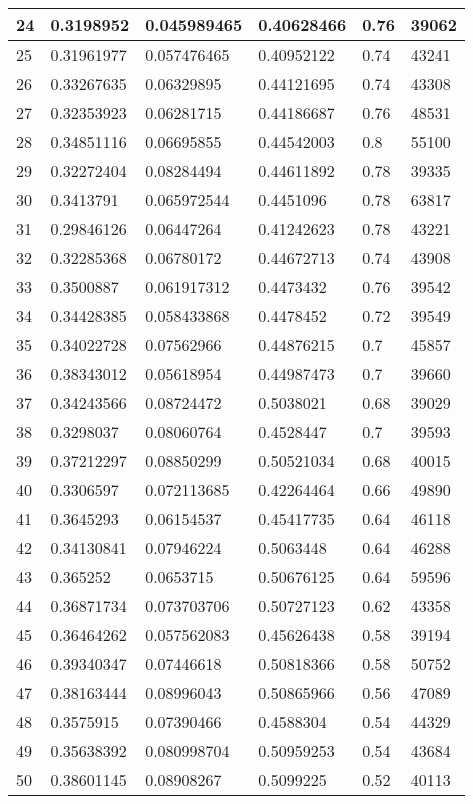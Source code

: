 \begin{longtable}{|l|l|l|l|l|l|}
24 & 0.3198952 & 0.045989465 & 0.40628466 & 0.76 & 39062 \\ \hline 
25 & 0.31961977 & 0.057476465 & 0.40952122 & 0.74 & 43241 \\ \hline 
26 & 0.33267635 & 0.06329895 & 0.44121695 & 0.74 & 43308 \\ \hline 
27 & 0.32353923 & 0.06281715 & 0.44186687 & 0.76 & 48531 \\ \hline 
28 & 0.34851116 & 0.06695855 & 0.44542003 & 0.8 & 55100 \\ \hline 
29 & 0.32272404 & 0.08284494 & 0.44611892 & 0.78 & 39335 \\ \hline 
30 & 0.3413791 & 0.065972544 & 0.4451096 & 0.78 & 63817 \\ \hline 
31 & 0.29846126 & 0.06447264 & 0.41242623 & 0.78 & 43221 \\ \hline 
32 & 0.32285368 & 0.06780172 & 0.44672713 & 0.74 & 43908 \\ \hline 
33 & 0.3500887 & 0.061917312 & 0.4473432 & 0.76 & 39542 \\ \hline 
34 & 0.34428385 & 0.058433868 & 0.4478452 & 0.72 & 39549 \\ \hline 
35 & 0.34022728 & 0.07562966 & 0.44876215 & 0.7 & 45857 \\ \hline 
36 & 0.38343012 & 0.05618954 & 0.44987473 & 0.7 & 39660 \\ \hline 
37 & 0.34243566 & 0.08724472 & 0.5038021 & 0.68 & 39029 \\ \hline 
38 & 0.3298037 & 0.08060764 & 0.4528447 & 0.7 & 39593 \\ \hline 
39 & 0.37212297 & 0.08850299 & 0.50521034 & 0.68 & 40015 \\ \hline 
40 & 0.3306597 & 0.072113685 & 0.42264464 & 0.66 & 49890 \\ \hline 
41 & 0.3645293 & 0.06154537 & 0.45417735 & 0.64 & 46118 \\ \hline 
42 & 0.34130841 & 0.07946224 & 0.5063448 & 0.64 & 46288 \\ \hline 
43 & 0.365252 & 0.0653715 & 0.50676125 & 0.64 & 59596 \\ \hline 
44 & 0.36871734 & 0.073703706 & 0.50727123 & 0.62 & 43358 \\ \hline 
45 & 0.36464262 & 0.057562083 & 0.45626438 & 0.58 & 39194 \\ \hline 
46 & 0.39340347 & 0.07446618 & 0.50818366 & 0.58 & 50752 \\ \hline 
47 & 0.38163444 & 0.08996043 & 0.50865966 & 0.56 & 47089 \\ \hline 
48 & 0.3575915 & 0.07390466 & 0.4588304 & 0.54 & 44329 \\ \hline 
49 & 0.35638392 & 0.080998704 & 0.50959253 & 0.54 & 43684 \\ \hline 
50 & 0.38601145 & 0.08908267 & 0.5099225 & 0.52 & 40113 \\ \hline 
\end{longtable}